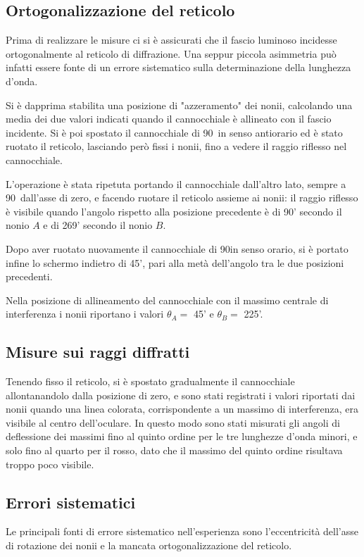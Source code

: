 \documentclass[italian,a4paper]{article}
\begin{document}
\subsection*{Ortogonalizzazione del reticolo}
Prima di realizzare le misure ci si è assicurati che il fascio luminoso incidesse ortogonalmente al reticolo di diffrazione. Una seppur piccola asimmetria può infatti essere fonte di un errore sistematico sulla determinazione della lunghezza d'onda.

Si è dapprima stabilita una posizione di "azzeramento" dei nonii, calcolando una media dei due valori indicati quando il cannocchiale è allineato con il fascio incidente. Si è poi spostato il cannocchiale di 90\textdegree~in senso antiorario ed è stato ruotato il reticolo, lasciando però fissi i nonii, fino a vedere il raggio riflesso nel cannocchiale.

L'operazione è stata ripetuta portando il cannocchiale dall'altro lato, sempre a 90\textdegree~dall'asse di zero, e facendo ruotare il reticolo assieme ai nonii: il raggio riflesso è visibile quando l'angolo rispetto alla posizione precedente è di 90' secondo il nonio $A$ e di 269' secondo il nonio $B$.

Dopo aver ruotato nuovamente il cannocchiale di 90\textdegree in senso orario, si è portato infine lo schermo indietro di 45', pari alla metà dell'angolo tra le due posizioni precedenti.

Nella posizione di allineamento del cannocchiale con il massimo centrale di interferenza i nonii riportano i valori $\theta_A=$ 45' e $\theta_B=$ 225'.
\subsection*{Misure sui raggi diffratti}
Tenendo fisso il reticolo, si è spostato gradualmente il cannocchiale allontanandolo dalla posizione di zero, e sono stati registrati i valori riportati dai nonii quando una linea colorata, corrispondente a un massimo di interferenza, era visibile al centro dell'oculare.
In questo modo sono stati misurati gli angoli di deflessione dei massimi fino al quinto ordine per le tre lunghezze d'onda minori, e solo fino al quarto per il rosso, dato che il massimo del quinto ordine risultava troppo poco visibile.
\subsection*{Errori sistematici}
Le principali fonti di errore sistematico nell'esperienza sono l'eccentricità dell'asse di rotazione dei nonii e la mancata ortogonalizzazione del reticolo.
\end{document}
